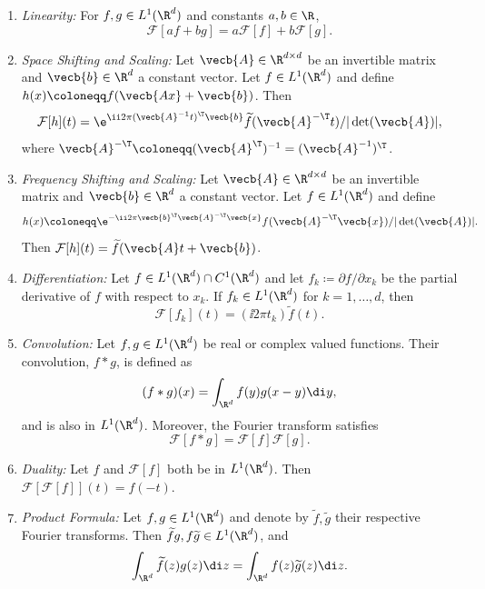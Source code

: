 \begin{enumerate}
	\item \textit{Linearity:} For $f, g \in L^1(\R^d)$ and constants $a, b \in \R$,
	      \begin{equation*}
		      \mathcal{F}[af + bg] = a\mathcal{F}[f] + b\mathcal{F}[g].
	      \end{equation*}
	\item \textit{Space Shifting and Scaling:} Let $\vecb{A} \in \R^{d \times d}$ be an invertible matrix and $\vecb{b} \in \R^d$ a constant vector. Let $f \in L^1(\R^d)$ and define $h(x) \coloneqq f(\vecb{Ax} + \vecb{b})$. Then
	      \begin{equation*}
		      \mathcal{F}[h](t) = \e^{\ii 2\pi (\vecb{A}^{-1} t)^\T \vecb{b}} \widetilde{f}(\vecb{A}^{-\T} t) / |\det(\vecb{A})|,
	      \end{equation*}
	      where $\vecb{A}^{-\T} \coloneqq (\vecb{A}^\T)^{-1} = (\vecb{A}^{-1})^\T$.
	\item \textit{Frequency Shifting and Scaling:} Let $\vecb{A} \in \R^{d \times d}$ be an invertible matrix and $\vecb{b} \in \R^d$ a constant vector. Let $f \in L^1(\R^d)$ and define
	      \begin{equation*}
		      h(x) \coloneqq \e^{-\ii 2\pi \vecb{b}^\T \vecb{A}^{-\T} \vecb{x}} f(\vecb{A}^{-\T} \vecb{x}) / |\det(\vecb{A})|.
	      \end{equation*}
	      Then $\mathcal{F}[h](t) = \widetilde{f}(\vecb{A}t + \vecb{b})$.
	\item \textit{Differentiation:} Let $f \in L^1(\R^d) \cap C^1(\R^d)$ and let $f_k \coloneqq \partial f / \partial x_k$ be the partial derivative of $f$ with respect to $x_k$. If $f_k \in L^1(\R^d)$ for $k=1, \dots, d$, then
	      \begin{equation*}
		      \mathcal{F}[f_k](t) = (\ii 2\pi t_k) \widetilde{f}(t).
	      \end{equation*}
	\item \textit{Convolution:} Let $f, g \in L^1(\R^d)$ be real or complex valued functions. Their convolution, $f * g$, is defined as
	      \begin{equation*}
		      (f * g)(x) = \int_{\R^d} f(y) g(x-y) \di y,
	      \end{equation*}
	      and is also in $L^1(\R^d)$. Moreover, the Fourier transform satisfies
	      \begin{equation*}
		      \mathcal{F}[f * g] = \mathcal{F}[f]\mathcal{F}[g].
	      \end{equation*}
	\item \textit{Duality:} Let $f$ and $\mathcal{F}[f]$ both be in $L^1(\R^d)$. Then $\mathcal{F}[\mathcal{F}[f]](t) = f(-t)$.
	\item \textit{Product Formula:} Let $f, g \in L^1(\R^d)$ and denote by $\widetilde{f}, \widetilde{g}$ their respective Fourier transforms. Then $\widetilde{f}g, f\widetilde{g} \in L^1(\R^d)$, and
	      \begin{equation*}
		      \int_{\R^d} \widetilde{f}(z) g(z) \di z = \int_{\R^d} f(z) \widetilde{g}(z) \di z.
	      \end{equation*}
\end{enumerate}

